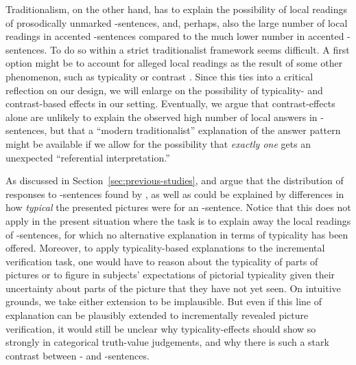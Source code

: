 \documentclass[fleqn,reqno,10pt]{article}
\newcommand{\as}{\acro{as}}
\renewcommand{\es}{\acro{es}}
\begin{document}
Traditionalism, on the other hand, has to explain the possibility of
local readings of prosodically unmarked \es-sentences, and, perhaps,
also the large number of local readings in accented \es-sentences
compared to the much lower number in accented \as-sentences. To do so
within a strict traditionalist framework seems difficult. A first
option might be to account for alleged local readings as the result of
some other phenomenon, such as typicality or contrast
\citep{Tielvan-Tiel2012:Embedded-Scalar,GeurtsTielvan-Tiel2013:Embedded-Scalar,Tielvan-Tiel2014:Quantity-Matter}.
Since this ties into a critical reflection on our design, we will
enlarge on the possibility of typicality- and contrast-based effects
in our setting. Eventually, we argue that contrast-effects alone are
unlikely to explain the observed high number of local answers in
\es-sentences, but that a ``modern traditionalist'' explanation of the
answer pattern might be available if we allow for the possibility that
\emph{exactly one} gets an unexpected ``referential interpretation.''

As discussed in Section~\ref{sec:previous-studies},
\citet{Tielvan-Tiel2012:Embedded-Scalar} and
\citet{GeurtsTielvan-Tiel2013:Embedded-Scalar} argue that the
distribution of responses to \as-sentences found by
\citet{CliftonDube2010:Embedded-Implic}, as well as
\citet{ChemlaSpector2010:Experimental-Ev} could be explained by
differences in how \emph{typical} the presented pictures were for an
\as-sentence. Notice that this does not apply in the present situation
where the task is to explain away the local readings of \es-sentences,
for which no alternative explanation in terms of typicality has been
offered. Moreover, to apply typicality-based explanations to the
incremental verification task, one would have to reason about the
typicality of parts of pictures or to figure in subjects' expectations
of pictorial typicality given their uncertainty about parts of the
picture that they have not yet seen. On intuitive grounds, we take
either extension to be implausible. But even if this line of
explanation can be plausibly extended to incrementally revealed
picture verification, it would still be unclear why typicality-effects
should show so strongly in categorical truth-value judgements, and why
there is such a stark contrast between \as- and \es-sentences.
\end{document}
